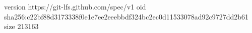 version https://git-lfs.github.com/spec/v1
oid sha256:c22bf88d3173338f0e1e7ee2eeebbdf324bc2ec0d11533078ad92c9727dd2b61
size 213163
